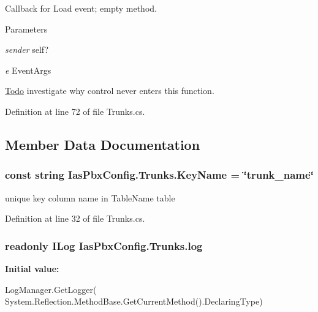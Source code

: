 Callback for Load event; empty method. 
\begin{DoxyParams}{Parameters}
\item[{\em sender}]self? \item[{\em e}]EventArgs \end{DoxyParams}
\begin{Desc}
\item[\hyperlink{todo__todo000051}{Todo}]investigate why control never enters this function. \end{Desc}


Definition at line 72 of file Trunks.cs.

\subsection{Member Data Documentation}
\hypertarget{class_ias_pbx_config_1_1_trunks_a399bf6ea5158c3c43fd2350be772fe45}{
\subsubsection[{KeyName}]{\setlength{\rightskip}{0pt plus 5cm}const string {\bf IasPbxConfig.Trunks.KeyName} = \char`\"{}trunk\_\-name\char`\"{}}}
\label{class_ias_pbx_config_1_1_trunks_a399bf6ea5158c3c43fd2350be772fe45}


unique key column name in TableName table 

Definition at line 32 of file Trunks.cs.\hypertarget{class_ias_pbx_config_1_1_trunks_a1b85e00c7fd451b3a368edef2210df49}{
\subsubsection[{log}]{\setlength{\rightskip}{0pt plus 5cm}readonly ILog {\bf IasPbxConfig.Trunks.log}}}
\label{class_ias_pbx_config_1_1_trunks_a1b85e00c7fd451b3a368edef2210df49}
{\bfseries Initial value:}
\begin{DoxyCode}
 LogManager.GetLogger(
            System.Reflection.MethodBase.GetCurrentMethod().DeclaringType)
\end{DoxyCode}


